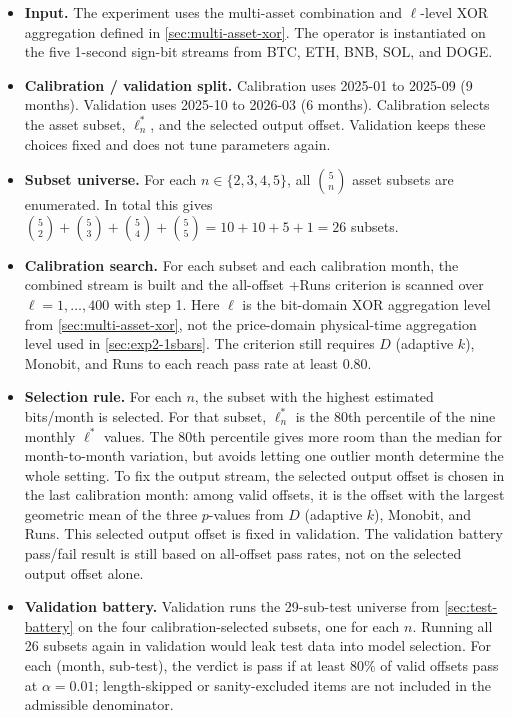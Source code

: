 \documentclass[11pt,titlepage,openany,oneside]{book}  %
\begin{document}
\begin{itemize}
\item \textbf{Input.} The experiment uses the multi-asset combination and $\ell$-level XOR aggregation defined in \cref{sec:multi-asset-xor}. The operator is instantiated on the five 1-second sign-bit streams from BTC, ETH, BNB, SOL, and DOGE.

\item \textbf{Calibration / validation split.} Calibration uses 2025-01 to 2025-09 (9 months). Validation uses 2025-10 to 2026-03 (6 months). Calibration selects the asset subset, $\ell^*_n$, and the selected output offset. Validation keeps these choices fixed and does not tune parameters again.

\item \textbf{Subset universe.} For each $n \in \{2,3,4,5\}$, all $\binom{5}{n}$ asset subsets are enumerated. In total this gives
$\binom{5}{2}+\binom{5}{3}+\binom{5}{4}+\binom{5}{5}=10+10+5+1=26$ subsets.

\item \textbf{Calibration search.} For each subset and each calibration month, the combined stream is built and the all-offset +Runs criterion is scanned over $\ell = 1,\ldots,400$ with step 1. Here $\ell$ is the bit-domain XOR aggregation level from \cref{sec:multi-asset-xor}, not the price-domain physical-time aggregation level used in \cref{sec:exp2-1sbars}. The criterion still requires $D$ (adaptive $k$), Monobit, and Runs to each reach pass rate at least $0.80$.

\item \textbf{Selection rule.} For each $n$, the subset with the highest estimated bits/month is selected. For that subset, $\ell^*_n$ is the 80th percentile of the nine monthly $\ell^*$ values. The 80th percentile gives more room than the median for month-to-month variation, but avoids letting one outlier month determine the whole setting. To fix the output stream, the selected output offset is chosen in the last calibration month: among valid offsets, it is the offset with the largest geometric mean of the three $p$-values from $D$ (adaptive $k$), Monobit, and Runs. This selected output offset is fixed in validation. The validation battery pass/fail result is still based on all-offset pass rates, not on the selected output offset alone.

\item \textbf{Validation battery.} Validation runs the 29-sub-test universe from \cref{sec:test-battery} on the four calibration-selected subsets, one for each $n$. Running all 26 subsets again in validation would leak test data into model selection. For each (month, sub-test), the verdict is pass if at least $80\%$ of valid offsets pass at $\alpha = 0.01$; length-skipped or sanity-excluded items are not included in the admissible denominator.
\end{itemize}
\end{document}
